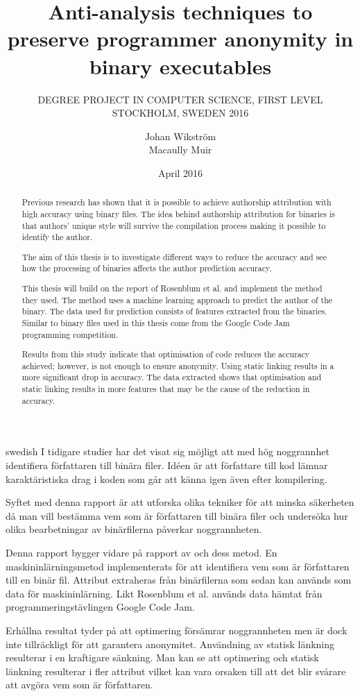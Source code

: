 \documentclass[a4paper,11pt]{kth-mag}
\title{Anti-analysis techniques to preserve programmer anonymity in binary
executables}
\subtitle{
    DEGREE PROJECT IN COMPUTER SCIENCE, FIRST LEVEL \\
    STOCKHOLM, SWEDEN 2016
}
\author{Johan Wikström \\ Macaully Muir}
\date{April 2016}
\begin{document}
\frontmatter
\pagestyle{empty}
\removepagenumbers
\maketitle
{}
\begin{abstract}
Previous research has shown that it is possible to achieve authorship
attribution with high accuracy using binary files. The idea behind authorship
attribution for binaries is that authors’ unique style will survive the
compilation process making it possible to identify the author.    

The aim of this thesis is to investigate different ways to reduce the accuracy
and see how the processing of binaries affects the author prediction accuracy.

This thesis will build on the report of Rosenblum et al. and implement the method
they used. The method uses a machine learning approach to predict the author
of the binary. The data used for prediction consists of features extracted from
the binaries. Similar to \parencite{rosenblum2011wrote} binary files used in this
thesis come from the Google Code Jam programming competition.

Results from this study indicate that optimisation of code reduces the accuracy
achieved; however, is not enough to ensure anonymity. Using static linking
results in a more significant drop in accuracy. The data extracted shows that
optimisation and static linking results in more features that may be the cause
of the reduction in accuracy.
\end{abstract}
\clearpage
\begin{foreignabstract}{swedish}
I tidigare studier har det visat sig möjligt att med hög noggrannhet
identifiera författaren till binära filer. Idéen är att författare till kod
lämnar karaktäristiska drag i koden som går att känna igen även efter
kompilering. 

Syftet med denna rapport är att utforska olika tekniker för att minska
säkerheten då man vill bestämma vem som är författaren till binära filer och
undersöka hur olika bearbetningar av binärfilerna påverkar noggrannheten.     

Denna rapport bygger vidare på rapport av \parencite{rosenblum2011wrote}
och dess metod. En maskininlärningsmetod implementerats för
att identifiera vem som är författaren till en binär fil. Attribut extraheras
från binärfilerna som sedan kan används som data för maskininlärning. Likt
Rosenblum et al. används data hämtat från programmeringstävlingen Google Code
Jam. 

Erhållna resultat tyder på att optimering försämrar noggrannheten men är dock
inte tillräckligt för att garantera anonymitet. Användning av statisk länkning
resulterar i en kraftigare sänkning. Man kan se att optimering och statisk
länkning resulterar i fler attribut vilket kan vara orsaken till att det blir
svårare att avgöra vem som är författaren.
\end{foreignabstract}
\clearpage
\tableofcontents*
\mainmatter
\pagestyle{newchap}
\end{document}
